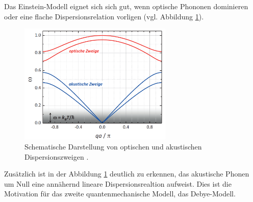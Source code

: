 Das Einstein-Modell eignet sich sich gut, wenn optische Phononen dominieren oder eine
flache Dispersionsrelation vorligen (vgl. Abbildung \ref{fig: dispersions_relation}).
\begin{figure}
  \centering
  \includegraphics[width = 0.65\textwidth]{./content/images/optische_akustische.PNG}
  \caption{Schematische Darstellung von optischen und akustischen Dispersionszweigen \cite[S. 223]{marx}.}
  \label{fig: dispersions_relation}
\end{figure}
Zusätzlich ist in der Abbildung \ref{fig: dispersions_relation} deutlich zu erkennen,
das akustische Phonen um Null eine annähernd lineare Dispersionsrealtion aufweist.
Dies ist die Motivation für das zweite quantenmechanische Modell, das
Debye-Modell.

